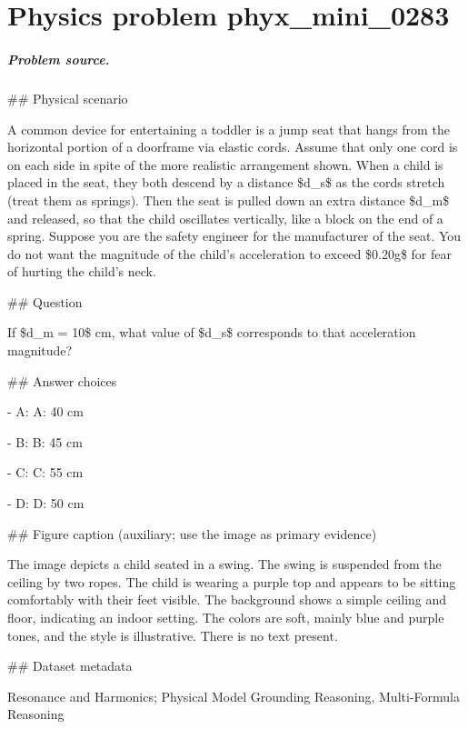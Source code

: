 
\chapter{Physics problem phyx\_mini\_0283}
\label{ch:PhyXMiniProblems_problem_phyx_mini_0283}

\paragraph{Problem source.}
\#\# Physical scenario

A common device for entertaining a toddler is a jump seat that hangs from the horizontal portion of a doorframe via elastic cords. Assume that only one cord is on each side in spite of the more realistic arrangement shown. When a child is placed in the seat, they both descend by a distance \$d\_s\$ as the cords stretch (treat them as springs). Then the seat is pulled down an extra distance \$d\_m\$ and released, so that the child oscillates vertically, like a block on the end of a spring. Suppose you are the safety engineer for the manufacturer of the seat. You do not want the magnitude of the child's acceleration to exceed \$0.20g\$ for fear of hurting the child's neck.

\#\# Question

If \$d\_m = 10\$ cm, what value of \$d\_s\$ corresponds to that acceleration magnitude?

\#\# Answer choices

- A: A: 40 cm

- B: B: 45 cm

- C: C: 55 cm

- D: D: 50 cm

\#\# Figure caption (auxiliary; use the image as primary evidence)

The image depicts a child seated in a swing. The swing is suspended from the ceiling by two ropes. The child is wearing a purple top and appears to be sitting comfortably with their feet visible. The background shows a simple ceiling and floor, indicating an indoor setting. The colors are soft, mainly blue and purple tones, and the style is illustrative. There is no text present.

\#\# Dataset metadata

Resonance and Harmonics; Physical Model Grounding Reasoning, Multi-Formula Reasoning

